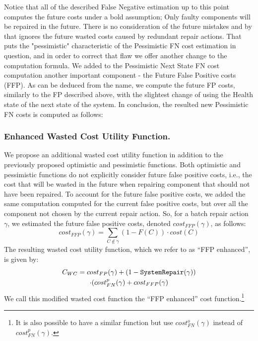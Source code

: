 \documentclass[review]{elsarticle}
\newcommand\sysrep[1]{{\tt SystemRepair(#1)}}
\begin{document}
Notice that all of the described False Negative estimation up to this point computes the future costs under a bold assumption; Only faulty components will be repaired in the future. There is no consideration of the future mistakes and by that ignores the future wasted costs caused by redundant repair actions. That puts the "pessimistic" characteristic  of the Pessimistic FN cost estimation in question, and in order to correct that flaw we offer another change to the computation formula.
We added to the Pessimistic Next State FN cost computation another important component - the Future False Positive costs (FFP). As can be deduced from the name, we compute the future FP costs, similarly to the FP described above, with the slightest change of using the Health state of the next state of the system. 
In conclusion, the resulted new Pessimistic FN costs is computed as follows: 

\subsubsection{Enhanced Wasted Cost Utility Function.}
We propose an additional wasted cost utility function in addition to the previously proposed optimistic and pessimistic functions. 
Both optimistic and pessimistic functions do not explicitly consider future false positive costs, 
i.e., the cost that will be wasted in the future when repairing component that should not have been repaired. 
To account for the future false positive costs, we added the same computation computed for the current false positive costs, but over all the component not chosen by the current repair action. 
So, for a batch repair action $\gamma$, we estimated the future false positive costs, denoted $cost_{FFP}(\gamma)$, as follows:
\[
cost_{FFP}(\gamma)=\sum_{C \notin \gamma} (1-F(C))\cdot cost(C) 
\] 
The resulting wasted cost utility function, which we refer to as ``FFP enhanced'',  is given by:
\begin{multline}
C_{WC}=cost_{FP}(\gamma)+(1-\sysrep{\gamma}) \\
\cdot (cost^p_{FN}(\gamma)+ cost_{FFP}(\gamma)
\end{multline}
We call this modified wasted cost function the ``FFP enhanced'' cost function.\footnote{It is also possible to have a similar function but use $cost^o_{FN}(\gamma)$ instead of $cost^p_{FN}(\gamma)$.}
\end{document}
